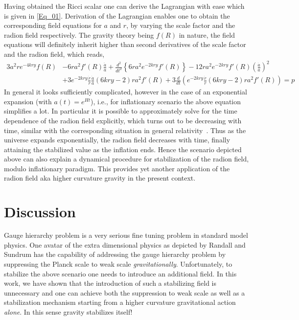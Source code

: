 \documentclass{article}
\def\gr{general relativity}
\begin{document}
Having obtained the Ricci scalar one can derive the Lagrangian with ease which is given in \ref{Eq_01}. Derivation of the Lagrangian enables one to obtain the corresponding field equations for $a$ and $r$, by varying the scale factor and the radion field respectively. The gravity theory being $f(R)$ in nature, the field equations will definitely inherit higher than second derivatives of the scale factor and the radion field, which reads,
\begin{align}
3a^{2}re^{-4kry}f(R)&-6ra^{2}f'(R)\frac{\ddot{a}}{a}+\frac{d^{2}}{dt^{2}}\left\{6ra^{2}e^{-2kry}f'(R) \right\}
-12ra^{2}e^{-2kry}f'(R)\left(\frac{\dot{a}}{a}\right)^{2}
\nonumber
\\
&+3e^{-2kry}\frac{\dot{r}}{r}\frac{\dot{a}}{a}\left(6kry-2\right)ra^{2}f'(R)
+3\frac{d}{dt}\left(e^{-2kry}\frac{\dot{r}}{r}(6kry-2)ra^{2}f'(R) \right)=p
\end{align}
In general it looks sufficiently complicated, however in the case of an exponential expansion (with $a(t)=e^{Ht}$), i.e., for inflationary scenario the above equation simplifies a lot. In particular it is possible to approximately solve for the time dependence of the radion field explicitly, which turns out to be decreasing with time, similar with the corresponding situation in \gr\ \cite{Chakraborty:2013ipa}. Thus as the universe expands exponentially, the radion field decreases with time, finally attaining the stabilized value as the inflation ends. Hence the scenario depicted above can also explain a dynamical procedure for stabilization of the radion field, modulo inflationary paradigm. This provides yet another application of the radion field aka higher curvature gravity in the present context.
\section{Discussion}

Gauge hierarchy problem is a very serious fine tuning problem in standard model physics. One avatar of the extra dimensional physics as depicted by Randall and Sundrum has the capability of addressing the gauge hierarchy problem by suppressing the Planck scale to weak scale \emph{gravitationally}. Unfortunately, to stabilize the above scenario one needs to introduce an additional field. In this work, we have shown that the introduction of such a stabilizing field is unnecessary and one can achieve both the suppression to weak scale as well as a stabilization mechanism starting from a higher curvature gravitational action \emph{alone}. In this sense gravity stabilizes itself! 
\end{document}
